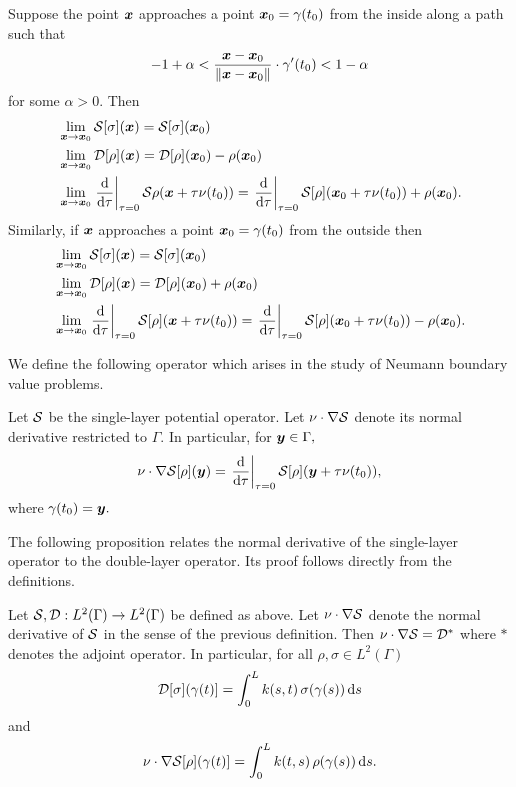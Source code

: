 \begin{theorem}\label{thm:potlim}
Suppose the point $\boldsymbol{x}$ approaches a point $\boldsymbol{x}_0 = \gamma(t_0)$ from the inside along a path such that 
\begin{align}
-1+\alpha<\frac{\boldsymbol{x}-\boldsymbol{x}_0}{\|\boldsymbol{x}-\boldsymbol{x}_0\|} \cdot \gamma'(t_0) <1-\alpha
\end{align}
for some $\alpha >0.$ Then 
\begin{align}
&\lim_{\boldsymbol{x} \to \boldsymbol{x}_0} \mathcal{S}[\sigma](\boldsymbol{x}) = \mathcal{S}[\sigma](\boldsymbol{x}_0)\\
&\lim_{\boldsymbol{x} \to \boldsymbol{x}_0} \mathcal{D}[\rho](\boldsymbol{x}) = \mathcal{D}[\rho](\boldsymbol{x}_0)- \rho(\boldsymbol{x}_0)\\
&\lim_{\boldsymbol{x} \to \boldsymbol{x}_0} \left.\frac{{\rm d}}{{\rm d}\tau}\right|_{\tau= 0}\mathcal{S}\rho(\boldsymbol{x}+\tau \nu(t_0)) = \left.\frac{{\rm d}}{{\rm d}\tau}\right|_{\tau= 0}\mathcal{S}[\rho](\boldsymbol{x}_0+\tau \nu(t_0))+ \rho(\boldsymbol{x}_0).
\end{align}
Similarly, if $\boldsymbol{x}$ approaches a point $\boldsymbol{x}_0 = \gamma(t_0)$ from the outside then
\begin{align}
&\lim_{\boldsymbol{x} \to \boldsymbol{x}_0} \mathcal{S}[\sigma](\boldsymbol{x}) = \mathcal{S}[\sigma](\boldsymbol{x}_0)\\
&\lim_{\boldsymbol{x} \to \boldsymbol{x}_0} \mathcal{D}[\rho](\boldsymbol{x}) = \mathcal{D}[\rho](\boldsymbol{x}_0)+ \rho(\boldsymbol{x}_0)\\
&\lim_{\boldsymbol{x} \to \boldsymbol{x}_0} \left.\frac{{\rm d}}{{\rm d}\tau}\right|_{\tau= 0}\mathcal{S}[\rho](\boldsymbol{x}+\tau \nu(t_0)) = \left.\frac{{\rm d}}{{\rm d}\tau}\right|_{\tau= 0}\mathcal{S}[\rho](\boldsymbol{x}_0+\tau \nu(t_0))- \rho(\boldsymbol{x}_0).
\end{align}
\end{theorem}

We define the following operator which arises in the study of Neumann boundary value problems.
\begin{definition}
Let $\mathcal{S}$ be the single-layer potential operator. Let $\nu\cdot \nabla \mathcal{S}$  denote its normal derivative restricted to $\Gamma.$ In particular, for $\boldsymbol{y} \in \Gamma,$
\begin{align}
\nu\cdot \nabla \mathcal{S}[\rho] (\boldsymbol{y}) = \left.\frac{{\rm d}}{{\rm d}\tau}\right|_{\tau = 0} \mathcal{S}[\rho](\boldsymbol{y} + \tau \nu(t_0)),
\end{align}
where $\gamma(t_0) = \boldsymbol{y}.$
\end{definition}

The following proposition relates the normal derivative of the single-layer operator to the double-layer operator. Its proof follows directly from the definitions.
\begin{proposition}
Let $\mathcal{S},\mathcal{D}:L^2(\Gamma) \to L^2(\Gamma)$ be defined as above. Let $\nu \cdot \nabla \mathcal{S}$ denote the normal derivative of $\mathcal{S}$ in the sense of the previous definition. Then $\nu \cdot \nabla \mathcal{S} = \mathcal{D}^*$ where $*$ denotes the adjoint operator. In particular, for all $\rho,\sigma \in L^2(\Gamma)$
\begin{align}
\mathcal{D}[\sigma](\gamma(t)] = \int_0^L k(s,t)\,\sigma(\gamma(s))\, {\rm d}s
\end{align}
and
\begin{align}
\nu\cdot \nabla\mathcal{S}[\rho](\gamma(t)] = \int_0^L k(t,s)\,\rho(\gamma(s))\, {\rm d}s.
\end{align}
\end{proposition}

